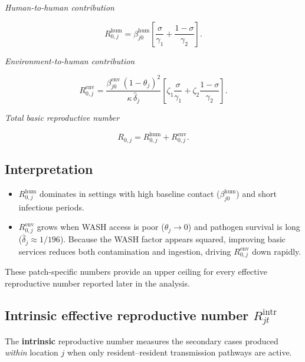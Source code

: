 \documentclass[
]{book}
\providecommand{\tightlist}{%
  \setlength{\itemsep}{0pt}\setlength{\parskip}{0pt}}
\begin{document}
\emph{Human-to-human contribution}

\[
R_{0,j}^{\text{hum}}
  = \beta_{j0}^{\text{hum}}
    \left[\frac{\sigma}{\gamma_1}
          +\frac{1-\sigma}{\gamma_2}\right].
\]

\emph{Environment-to-human contribution}

\[
R_{0,j}^{\text{env}}
  = \frac{\beta_{j0}^{\text{env}}\,(1-\theta_j)^{2}}
         {\kappa\,\widehat{\delta}_j}
    \left[\zeta_1\frac{\sigma}{\gamma_1}
          +\zeta_2\frac{1-\sigma}{\gamma_2}\right].
\]

\emph{Total basic reproductive number}

\[
R_{0,j}
  = R_{0,j}^{\text{hum}} + R_{0,j}^{\text{env}}.
\]

\subsection{Interpretation}\label{interpretation}

\begin{itemize}
\tightlist
\item
  \textbf{\(R_{0,j}^{\text{hum}}\)} dominates in settings with high baseline contact (\(\beta_{j0}^{\text{hum}}\)) and short infectious periods.\\
\item
  \textbf{\(R_{0,j}^{\text{env}}\)} grows when WASH access is poor (\(\theta_j\!\to\!0\)) and pathogen survival is long (\(\widehat{\delta}_j \approx 1/196\)).
  Because the WASH factor appears squared, improving basic services reduces both contamination and ingestion, driving \(R_{0,j}^{\text{env}}\) down rapidly.
\end{itemize}

These patch-specific numbers provide an upper ceiling for every effective reproductive number reported later in the analysis.

\subsection{\texorpdfstring{Intrinsic effective reproductive number \(R_{jt}^{\mathrm{intr}}\)}{Intrinsic effective reproductive number R\_\{jt\}\^{}\{\textbackslash mathrm\{intr\}\}}}\label{intrinsic-effective-reproductive-number-r_jtmathrmintr}

The \textbf{intrinsic} reproductive number measures the secondary cases produced \emph{within} location \(j\) when only resident--resident transmission pathways are active.
\end{document}
